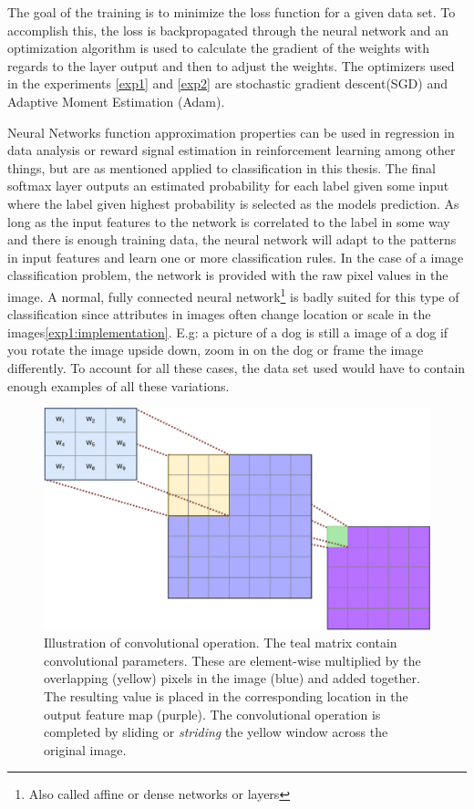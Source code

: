 The goal of the training is to minimize the loss function for a given data set. To accomplish this, the loss is backpropagated through the neural network and an optimization algorithm is used to calculate the gradient of the weights with regards to the layer output and then to adjust the weights. The optimizers used in the experiments \ref{exp1} and \ref{exp2} are stochastic gradient descent(SGD)\cite{sgd} and Adaptive Moment Estimation (Adam)\cite{adam}. 

Neural Networks function approximation properties can be used in regression in data analysis or reward signal estimation in reinforcement learning among other things, but are as mentioned applied to classification in this thesis. 
The final softmax layer outputs an estimated probability for each label given some input where the label given highest probability is selected as the models prediction. As long as the input features to the network is correlated to the label in some way and there is enough training data, the neural network will adapt to the patterns in input features and learn one or more classification rules. In the case of a image classification problem, the network is provided with the raw pixel values in the image. A normal, fully connected neural network\footnote{Also called affine or dense networks or layers} is badly suited for this type of classification since attributes in images often change location or scale in the images\ref{exp1:implementation}. E.g: a picture of a dog is still a image of a dog if you rotate the image upside down, zoom in on the dog or frame the image differently. To account for all these cases, the data set used would have to contain enough examples of all these variations.
\begin{figure}[h] 
    \centering
    \includegraphics[width=\linewidth]{Chapters/Background/figures/convolution.pdf}
    \caption{Illustration of convolutional operation. The teal matrix contain convolutional parameters. These are element-wise multiplied by the overlapping (yellow) pixels in the image (blue) and added together. The resulting value is placed in the corresponding location in the output feature map (purple). The convolutional operation is completed by sliding or \textit{striding} the yellow window across the original image.}
    \label{fig:conv}
\end{figure}
